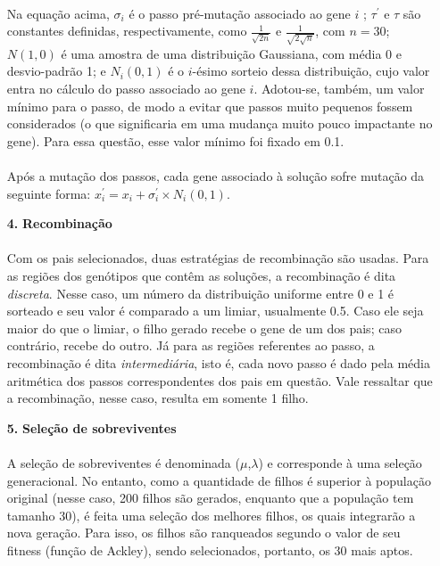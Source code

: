 \documentclass{report}
\begin{document}
\begin{itemize}
		\paragraph{} Na equação acima, $\sigma_i$ é o passo pré-mutação associado ao gene $i$	; $\tau^{'}$ e $\tau$ são constantes definidas, respectivamente, como $\frac{1}{\sqrt{2n}}$ e $\frac{1}{\sqrt{2 \sqrt{n}}}$, com $n = 30$; $N(1,0)$ é uma amostra de uma distribuição Gaussiana, com média 0 e desvio-padrão 1; e $N_i(0,1)$ é o $i$-ésimo sorteio dessa distribuição, cujo valor entra no cálculo do passo associado ao gene $i$. Adotou-se, também, um valor mínimo para o passo, de modo a evitar que passos muito pequenos fossem considerados (o que significaria em uma mudança muito pouco impactante no gene). Para essa questão, esse valor mínimo foi fixado em 0.1.\\
		
		\paragraph{} Após a mutação dos passos, cada gene associado à solução sofre mutação da seguinte forma: $x_i^{'} = x_i + \sigma_i^{'} \times N_i(0,1)$.	
	
		\item[\textbf{4.}] \textbf{Recombinação}
		
		\paragraph{} Com os pais selecionados, duas estratégias de recombinação são usadas. Para as regiões dos genótipos que contêm as soluções, a recombinação é dita \emph{discreta}. Nesse caso, um número da distribuição uniforme entre 0 e 1 é sorteado e seu valor é comparado a um limiar, usualmente 0.5. Caso ele seja maior do que o limiar, o filho gerado recebe o gene de um dos pais; caso contrário, recebe do outro. Já para as regiões referentes ao passo, a recombinação é dita \emph{intermediária}, isto é, cada novo passo é dado pela média aritmética dos passos correspondentes dos pais em questão. Vale ressaltar que a recombinação, nesse caso, resulta em somente 1 filho.\\
		
		\item[\textbf{5.}] \textbf{Seleção de sobreviventes}
		
		\paragraph{} A seleção de sobreviventes é denominada ($\mu$,$\lambda$) e corresponde à uma seleção generacional. No entanto, como a quantidade de filhos é superior à população original (nesse caso, 200 filhos são gerados, enquanto que a população tem tamanho 30), é feita uma seleção dos melhores filhos, os quais integrarão a nova geração. Para isso, os filhos são ranqueados segundo o valor de seu fitness (função de Ackley), sendo selecionados, portanto, os 30 mais aptos.\\
		

\end{itemize}
\end{document}
